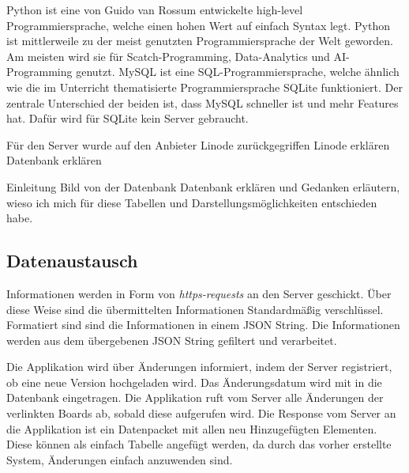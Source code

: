 Python ist eine von Guido van Rossum entwickelte high-level Programmiersprache, welche einen hohen Wert auf einfach Syntax legt. Python ist mittlerweile zu der meist genutzten Programmiersprache der Welt geworden. Am meisten wird sie für Scatch-Programming, Data-Analytics und AI-Programming genutzt. MySQL ist eine SQL-Programmiersprache, welche ähnlich wie die im Unterricht thematisierte Programmiersprache SQLite funktioniert. Der zentrale Unterschied der beiden ist, dass MySQL schneller ist und mehr Features hat. Dafür wird für SQLite kein Server gebraucht.



Für den Server wurde auf den Anbieter Linode zurückgegriffen 
Linode erklären
Datenbank erklären

Einleitung
Bild von der Datenbank
Datenbank erklären und Gedanken erläutern, wieso ich mich für diese Tabellen und Darstellungsmöglichkeiten entschieden habe.

\subsection{Datenaustausch}

Informationen werden in Form von \textit{https-requests} an den Server geschickt. Über diese Weise sind die übermittelten Informationen Standardmäßig verschlüssel. Formatiert sind sind die Informationen in einem JSON String. Die Informationen werden aus dem übergebenen JSON String gefiltert und verarbeitet.

Die Applikation wird über Änderungen informiert, indem der Server registriert, ob eine neue Version hochgeladen wird. Das Änderungsdatum wird mit in die Datenbank eingetragen. Die Applikation ruft vom Server alle Änderungen der verlinkten Boards ab, sobald diese aufgerufen wird. Die Response vom Server an die Applikation ist ein Datenpacket mit allen neu Hinzugefügten Elementen. Diese können als einfach Tabelle angefügt werden, da durch das vorher erstellte System, Änderungen einfach anzuwenden sind.




